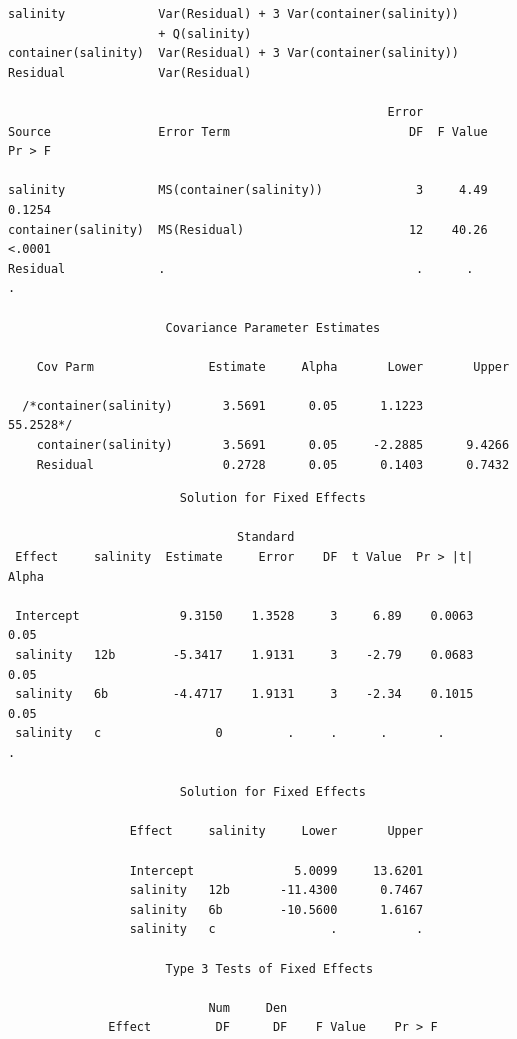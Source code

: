 \begin{large}
\begin{verbatim}
salinity             Var(Residual) + 3 Var(container(salinity))            
                     + Q(salinity)                                         
container(salinity)  Var(Residual) + 3 Var(container(salinity))            
Residual             Var(Residual)                                         
 
                                                     Error
Source               Error Term                         DF  F Value  Pr > F

salinity             MS(container(salinity))             3     4.49  0.1254
container(salinity)  MS(Residual)                       12    40.26  <.0001
Residual             .                                   .      .     .    

                      Covariance Parameter Estimates  
 
    Cov Parm                Estimate     Alpha       Lower       Upper

  /*container(salinity)       3.5691      0.05      1.1223     55.2528*/
    container(salinity)       3.5691      0.05     -2.2885      9.4266
    Residual                  0.2728      0.05      0.1403      0.7432

\end{verbatim}
\newpage
\begin{verbatim}
                        Solution for Fixed Effects
 
                                Standard
 Effect     salinity  Estimate     Error    DF  t Value  Pr > |t|   Alpha

 Intercept              9.3150    1.3528     3     6.89    0.0063    0.05
 salinity   12b        -5.3417    1.9131     3    -2.79    0.0683    0.05
 salinity   6b         -4.4717    1.9131     3    -2.34    0.1015    0.05
 salinity   c                0         .     .      .       .           .

                        Solution for Fixed Effects
 
                 Effect     salinity     Lower       Upper

                 Intercept              5.0099     13.6201
                 salinity   12b       -11.4300      0.7467
                 salinity   6b        -10.5600      1.6167
                 salinity   c                .           .

                      Type 3 Tests of Fixed Effects
 
                            Num     Den
              Effect         DF      DF    F Value    Pr > F


\end{verbatim}
\end{large}
